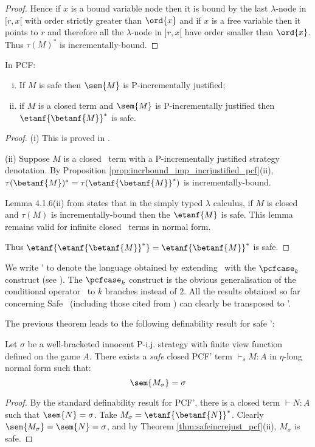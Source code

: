 \begin{proof}
Hence if $x$ is a bound variable node then it is bound by the
last $\lambda$-node in $[r,x[$ with order strictly greater than
$\ord{x}$ and if $x$ is a free variable then it points to $r$ and
therefore all the $\lambda$-node in $]r,x[$ have order smaller than
$\ord{x}$. Thus $\tau(M)^*$ is incrementally-bound.

\end{proof}

\begin{theorem}
\label{thm:safeincrejust_pcf} In PCF:
\begin{enumerate}[(i)]
\item If $M$ is safe then $\sem{M}$ is P-incrementally justified;
\item if $M$ is a closed term and $\sem{M}$ is
  P-incrementally justified then $\etanf{\betanf{M}}^*$ is safe.
\end{enumerate}
\end{theorem}
\begin{proof}
\noindent(i)
This is proved in  \cite[Theorem 4.2.10]{blumtransfer}.

\noindent(ii) Suppose $M$ is a closed \pcf\ term with a P-incrementally justified strategy denotation. By Proposition \ref{prop:incrbound_imp_incrjustified_pcf}(ii), $\tau(\betanf{M})^* = \tau(\etanf{\betanf{M}}^*)$ is incrementally-bound.

Lemma 4.1.6(ii) from \cite{blumtransfer} states that in the simply typed $\lambda$ calculus, if $M$ is closed and $\tau(M)$ is incrementally-bound then the $\etanf{M}$ is safe.
This lemma remains valid for infinite closed \pcf\ terms in normal form.

Thus $\etanf{\etanf{\betanf{M}}^*} = \etanf{\betanf{M}}^*$ is safe.
\end{proof}


We write \pcf' to denote the language obtained by extending \pcf\
with the $\pcfcase_k$ construct (see \cite{Abr02}).
The $\pcfcase_k$ construct is the obvious generalisation of the
conditional operator \pcfcond\ to $k$ branches instead of $2$. All the results obtained so far concerning Safe \pcf\ (including those
cited from \cite{blumtransfer}) can clearly be transposed to \pcf'.

The previous theorem leads to the following definability result for safe \pcf':
\begin{proposition}
\label{prop:safetydefinability}
Let $\sigma$ be a well-bracketed innocent
P-i.j. strategy with finite view function defined on the game $A$. There exists a \emph{safe} closed PCF' term $\vdash_s M : A$ in $\eta$-long normal form such that:
$$ \sem{M_\sigma} = \sigma $$
\end{proposition}
\begin{proof}
By the standard definability result for PCF', there is a closed term $\vdash N : A$ such that $\sem{N} = \sigma$.
Take $M_\sigma = \etanf{\betanf{N}}^*$.
Clearly $\sem{ M_\sigma} = \sem{N} = \sigma$, and by Theorem \ref{thm:safeincrejust_pcf}(ii), $M_\sigma$ is safe.
\end{proof}


